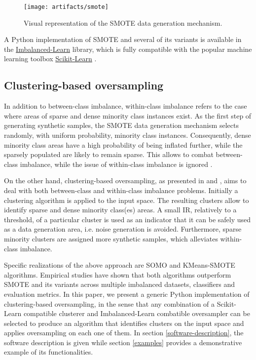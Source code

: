 \documentclass[preprint,12pt, a4paper]{elsarticle}
\begin{document}
\begin{figure}[H]
	\centering
	\texttt{[image: artifacts/smote]}
	\caption{Visual representation of the SMOTE data generation mechanism.}
	\label{fig:smote}
\end{figure}

A Python implementation of SMOTE and several of its variants is available in the \href{https://imbalanced-learn.org/stable/}{Imbalanced-Learn} \cite{Lemaitre2016} library, which is fully compatible with the popular machine learning toolbox \href{https://scikit-learn.org/stable/}{Scikit-Learn} \cite{Pedregosa2011}.

\subsection{Clustering-based oversampling}
\label{clustering-based-oversampling}

In addition to between-class imbalance, within-class imbalance refers to the case where areas of sparse and dense minority class instances exist. As the first step of generating synthetic samples, the SMOTE data generation mechanism selects randomly, with uniform probability, minority class instances. Consequently, dense minority class areas have a high probability of being inflated further, while the sparsely populated are likely to remain sparse. This allows to combat between-class imbalance, while the issue of within-class imbalance is ignored \cite{Prati2004}.

On the other hand, clustering-based oversampling, as presented in \cite{Douzas2017a} and \cite{Douzas2018}, aims to deal with both between-class and within-class imbalance problems. Initially a clustering algorithm is applied to the input space. The resulting clusters allow to identify sparse and dense minority class(es) areas. A small IR, relatively to a threshold, of a particular cluster is used as an indicator that it can be safely used as a data generation area, i.e. noise generation is avoided. Furthermore, sparse minority clusters are assigned more synthetic samples, which alleviates within-class imbalance.

Specific realizations of the above approach are SOMO \cite{Douzas2017a} and KMeans-SMOTE \cite{Douzas2018} algorithms. Empirical studies have shown that both algorithms outperform SMOTE and its variants across multiple imbalanced datasets, classifiers and evaluation metrics. In this paper, we present a generic Python implementation of clustering-based oversampling, in the sense that any combination of a Scikit-Learn compatible clusterer and Imbalanced-Learn combatible oversampler can be selected to produce an algorithm that identifies clusters on the input space and applies oversampling on each one of them.  In section \ref{software-description}, the software description is given while section \ref{examples} provides a demonstrative example of its functionalities.
\end{document}
